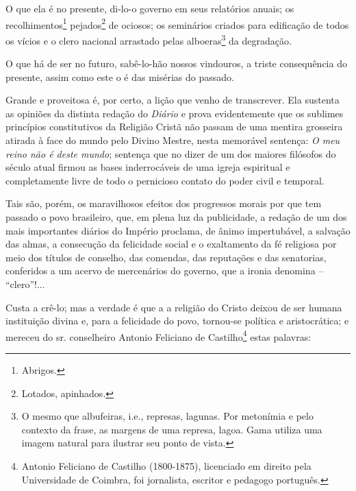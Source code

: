 O que ela é no presente, di-lo-o governo em seus relatórios anuais; os
recolhimentos\footnote{Abrigos.} pejados\footnote{Lotados,
  apinhados.} de ociosos; os seminários criados para edificação de todos
os vícios e o clero nacional arrastado pelas alboeras\footnote{O mesmo
  que albufeiras, i.e., represas, lagunas. Por metonímia e pelo contexto
  da frase, as margens de uma represa, lagoa. Gama utiliza uma imagem
  natural para ilustrar seu ponto de vista.} da degradação.

O que há de ser no futuro, sabê-lo-hão nossos vindouros, a triste
consequência do presente, assim como este o é das misérias do passado.

Grande e proveitosa é, por certo, a lição que venho de transcrever. Ela
sustenta as opiniões da distinta redação do \emph{Diário} e prova
evidentemente que os sublimes princípios constitutivos da Religião
Cristã não passam de uma mentira grosseira atirada à face do mundo pelo
Divino Mestre, nesta memorável sentença: \emph{O meu reino não é deste
mundo}; sentença que no dizer de um dos maiores filósofos do século
atual firmou as bases inderrocáveis de uma igreja espiritual e
completamente livre de todo o pernicioso contato do poder civil e
temporal.

Tais são, porém, os maravilhosos efeitos dos progressos morais por que
tem passado o povo brasileiro, que, em plena luz da publicidade, a
redação de um dos mais importantes diários do Império proclama, de ânimo
impertubável, a salvação das almas, a consecução da felicidade social e
o exaltamento da fé religiosa por meio dos títulos de conselho, das
comendas, das reputações e das senatorias, conferidos a um acervo de
mercenários do governo, que a ironia denomina -- ``clero''!...

Custa a crê-lo; mas a verdade é que a a religião do Cristo deixou de ser
humana instituição divina e, para a felicidade do povo, tornou-se
política e aristocrática; e mereceu do sr. conselheiro Antonio Feliciano
de Castilho\footnote{Antonio Feliciano de Castilho (1800-1875),
  licenciado em direito pela Universidade de Coimbra, foi jornalista,
  escritor e pedagogo português.} estas palavras:

